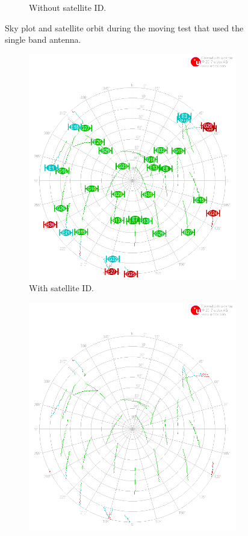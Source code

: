 \documentclass[letterpaper, 10 pt,onecolumn]{article}
\begin{document}
\begin{figure}[H]
\begin{subfigure}{.5\textwidth}
			\caption{	Without satellite ID.}
			\label{fig:mt1_obt}
		\end{subfigure}
		\caption[short]{Sky plot and satellite orbit during the moving test that used the single band antenna.}
		\label{fig:mt1} 
	\end{figure}
	\begin{figure}[H]
		\centering
		\begin{subfigure}{.5\textwidth}
			\includegraphics[width=0.9\linewidth]{../Moving_DualBand/skyplot.png}
			\caption{	
				With satellite ID.}
			\label{fig:mt2_sky}
		\end{subfigure}%
		\hfill
		\begin{subfigure}{.5\textwidth}
			\includegraphics[width=0.9\linewidth]{../Moving_DualBand/skyplot_orbit.png}

\end{subfigure}
\end{figure}
\end{document}
